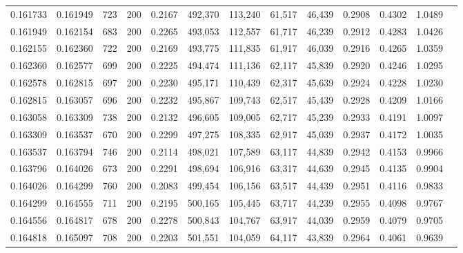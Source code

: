 \begin{tabular}{rrrrrrrrrrrrr}
0.161733 & 0.161949 &    723 & 200 &                                     0.2167 & 492,370 & 113,240 &  61,517 &  46,439 & 0.2908 & 0.4302 & 1.0489 \\
0.161949 & 0.162154 &    683 & 200 &                                     0.2265 & 493,053 & 112,557 &  61,717 &  46,239 & 0.2912 & 0.4283 & 1.0426 \\
0.162155 & 0.162360 &    722 & 200 &                                     0.2169 & 493,775 & 111,835 &  61,917 &  46,039 & 0.2916 & 0.4265 & 1.0359 \\
0.162360 & 0.162577 &    699 & 200 &                                     0.2225 & 494,474 & 111,136 &  62,117 &  45,839 & 0.2920 & 0.4246 & 1.0295 \\
0.162578 & 0.162815 &    697 & 200 &                                     0.2230 & 495,171 & 110,439 &  62,317 &  45,639 & 0.2924 & 0.4228 & 1.0230 \\
0.162815 & 0.163057 &    696 & 200 &                                     0.2232 & 495,867 & 109,743 &  62,517 &  45,439 & 0.2928 & 0.4209 & 1.0166 \\
0.163058 & 0.163309 &    738 & 200 &                                     0.2132 & 496,605 & 109,005 &  62,717 &  45,239 & 0.2933 & 0.4191 & 1.0097 \\
0.163309 & 0.163537 &    670 & 200 &                                     0.2299 & 497,275 & 108,335 &  62,917 &  45,039 & 0.2937 & 0.4172 & 1.0035 \\
0.163537 & 0.163794 &    746 & 200 &                                     0.2114 & 498,021 & 107,589 &  63,117 &  44,839 & 0.2942 & 0.4153 & 0.9966 \\
0.163796 & 0.164026 &    673 & 200 &                                     0.2291 & 498,694 & 106,916 &  63,317 &  44,639 & 0.2945 & 0.4135 & 0.9904 \\
0.164026 & 0.164299 &    760 & 200 &                                     0.2083 & 499,454 & 106,156 &  63,517 &  44,439 & 0.2951 & 0.4116 & 0.9833 \\
0.164299 & 0.164555 &    711 & 200 &                                     0.2195 & 500,165 & 105,445 &  63,717 &  44,239 & 0.2955 & 0.4098 & 0.9767 \\
0.164556 & 0.164817 &    678 & 200 &                                     0.2278 & 500,843 & 104,767 &  63,917 &  44,039 & 0.2959 & 0.4079 & 0.9705 \\
0.164818 & 0.165097 &    708 & 200 &                                     0.2203 & 501,551 & 104,059 &  64,117 &  43,839 & 0.2964 & 0.4061 & 0.9639 \\

\end{tabular}
